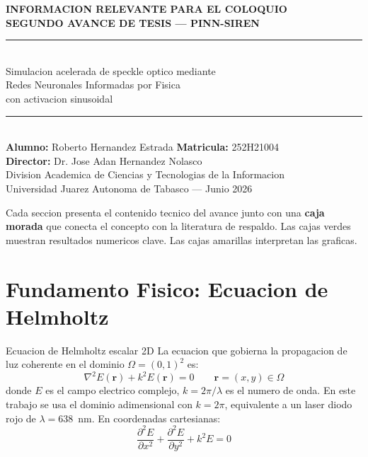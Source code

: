 \documentclass[12pt,a4paper]{article}
\begin{document}

\thispagestyle{empty}
\begin{center}
  \vspace*{1.5cm}
  {\Large\bfseries\color{azulujat}
    INFORMACION RELEVANTE PARA EL COLOQUIO\\[6pt]
    SEGUNDO AVANCE DE TESIS --- PINN-SIREN}\\[10pt]
  \rule{\textwidth}{1.5pt}\\[6pt]
  {\large Simulacion acelerada de speckle optico mediante\\
   Redes Neuronales Informadas por Fisica\\
   con activacion sinusoidal}\\[6pt]
  \rule{\textwidth}{1.5pt}\\[14pt]
  {\normalsize
    \textbf{Alumno:} Roberto Hernandez Estrada \quad
    \textbf{Matricula:} 252H21004\\
    \textbf{Director:} Dr. Jose Adan Hernandez Nolasco\\
    Division Academica de Ciencias y Tecnologias de la Informacion\\
    Universidad Juarez Autonoma de Tabasco --- Junio 2026
  }
\end{center}

\vspace{10pt}
\begin{tcolorbox}[colback=fondoazul!30,colframe=azulujat,
  title={\bfseries Como usar este documento},coltitle=white]
Cada seccion presenta el contenido tecnico del avance junto con una
\textbf{caja morada} que conecta el concepto con la literatura de respaldo.
Las cajas verdes muestran resultados numericos clave.
Las cajas amarillas interpretan las graficas.
\end{tcolorbox}

\tableofcontents
\newpage

\section{Fundamento Fisico: Ecuacion de Helmholtz}

\begin{definbox}{Ecuacion de Helmholtz escalar 2D}
La ecuacion que gobierna la propagacion de luz coherente en el dominio
$\Omega = (0,1)^2$ es:
\[
  \nabla^2 E(\mathbf{r}) + k^2 E(\mathbf{r}) = 0
  \qquad \mathbf{r} = (x,y) \in \Omega
\]
donde $E$ es el campo electrico complejo, $k = 2\pi/\lambda$ es el numero de onda.
En este trabajo se usa el dominio adimensional con $k = 2\pi$, equivalente a un
laser diodo rojo de $\lambda = 638$~nm. En coordenadas cartesianas:
\[
  \frac{\partial^2 E}{\partial x^2} + \frac{\partial^2 E}{\partial y^2} + k^2 E = 0
\]
\end{definbox}
\end{document}
